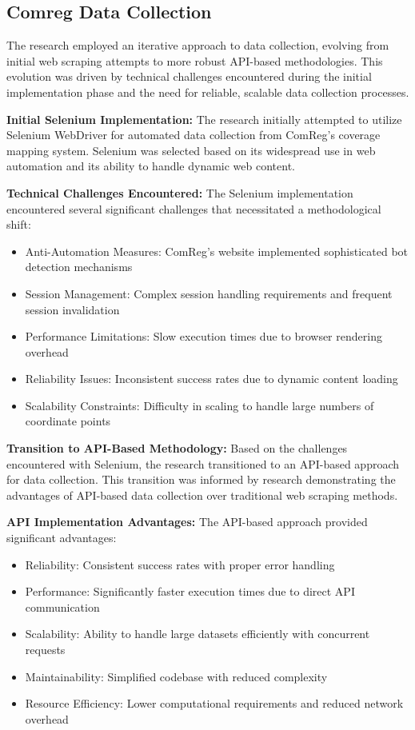\documentclass[MScCS]{uccthesis}
\begin{document}
   \subsection{Comreg Data Collection}
   The research employed an iterative approach to data collection, evolving from initial web scraping attempts to more robust API-based methodologies. This evolution was driven by technical challenges encountered during the initial implementation phase and the need for reliable, scalable data collection processes.

   \textbf{Initial Selenium Implementation:}
   The research initially attempted to utilize Selenium WebDriver for automated data collection from ComReg's coverage mapping system. Selenium was selected based on its widespread use in web automation and its ability to handle dynamic web content.

   \textbf{Technical Challenges Encountered:}
   The Selenium implementation encountered several significant challenges that necessitated a methodological shift:
   \begin{itemize}
   \item Anti-Automation Measures: ComReg's website implemented sophisticated bot detection mechanisms
   \item Session Management: Complex session handling requirements and frequent session invalidation
   \item Performance Limitations: Slow execution times due to browser rendering overhead
   \item Reliability Issues: Inconsistent success rates due to dynamic content loading
   \item Scalability Constraints: Difficulty in scaling to handle large numbers of coordinate points
   \end{itemize}

   \textbf{Transition to API-Based Methodology:}
   Based on the challenges encountered with Selenium, the research transitioned to an API-based approach for data collection. This transition was informed by research demonstrating the advantages of API-based data collection over traditional web scraping methods.

   \textbf{API Implementation Advantages:}
   The API-based approach provided significant advantages:
   \begin{itemize}
   \item Reliability: Consistent success rates with proper error handling
   \item Performance: Significantly faster execution times due to direct API communication
   \item Scalability: Ability to handle large datasets efficiently with concurrent requests
   \item Maintainability: Simplified codebase with reduced complexity
   \item Resource Efficiency: Lower computational requirements and reduced network overhead
   \end{itemize}
\end{document}
